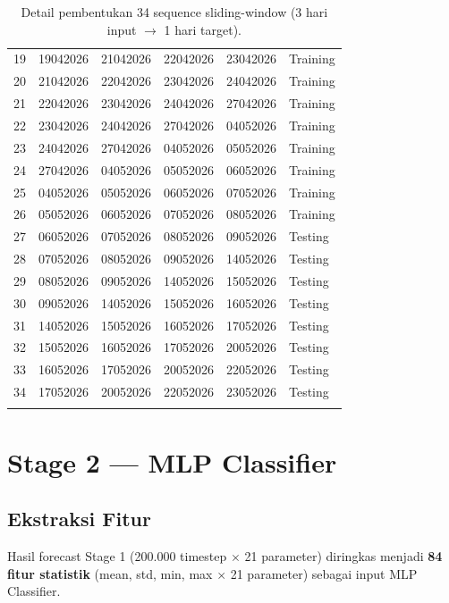 \documentclass[11pt,a4paper]{article}
\begin{document}
\begin{longtable}{clllll}
    19 & 19042026 & 21042026 & 22042026 & 23042026 & Training \\
    20 & 21042026 & 22042026 & 23042026 & 24042026 & Training \\
    21 & 22042026 & 23042026 & 24042026 & 27042026 & Training \\
    22 & 23042026 & 24042026 & 27042026 & 04052026 & Training \\
    23 & 24042026 & 27042026 & 04052026 & 05052026 & Training \\
    24 & 27042026 & 04052026 & 05052026 & 06052026 & Training \\
    25 & 04052026 & 05052026 & 06052026 & 07052026 & Training \\
    26 & 05052026 & 06052026 & 07052026 & 08052026 & Training \\
    27 & 06052026 & 07052026 & 08052026 & 09052026 & Testing \\
    28 & 07052026 & 08052026 & 09052026 & 14052026 & Testing \\
    29 & 08052026 & 09052026 & 14052026 & 15052026 & Testing \\
    30 & 09052026 & 14052026 & 15052026 & 16052026 & Testing \\
    31 & 14052026 & 15052026 & 16052026 & 17052026 & Testing \\
    32 & 15052026 & 16052026 & 17052026 & 20052026 & Testing \\
    33 & 16052026 & 17052026 & 20052026 & 22052026 & Testing \\
    34 & 17052026 & 20052026 & 22052026 & 23052026 & Testing \\
    \bottomrule
    \caption{Detail pembentukan 34 sequence sliding-window (3 hari input $\to$ 1 hari target).}
    \label{tab:seq}
\end{longtable}

\newpage
\section{Stage 2 — MLP Classifier}

\subsection{Ekstraksi Fitur}
Hasil forecast Stage 1 (200.000 timestep $\times$ 21 parameter) diringkas menjadi \textbf{84 fitur statistik} (mean, std, min, max $\times$ 21 parameter) sebagai input MLP Classifier.
\end{document}
